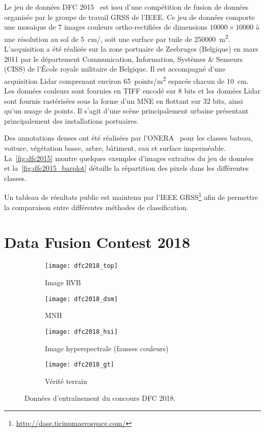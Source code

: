 Le jeu de données \gls{DFC} 2015~\cite{campos-taberner_processing_2016} est issu d'une compétition de fusion de données organisée par le groupe de travail \gls{GRSS} de l'\gls{IEEE}. Ce jeu de données comporte une mosaïque de 7 images couleurs ortho-rectifiées de dimensions $10 000\times10 000$ à une résolution au sol de \SI{5}{\centi\meter/\px}, soit une surface par tuile de \SI{250 000}{\meter\squared}. L'acquisition a été réalisée sur la zone portuaire de Zeebruges (Belgique) en mars 2011 par le département Communication, Information, Systèmes \& Senseurs (CISS) de l'École royale militaire de Belgique. Il est accompagné d'une acquisition \gls{Lidar} comprenant environ \SI{65}{points/\meter\squared} espacés chacun de \SI{10}{\centi\meter}. Les données couleurs sont fournies en \gls{TIFF} encodé sur 8 bits et les données \gls{Lidar} sont fournis rastérisées sous la forme d'un \gls{MNE} en flottant sur 32 bits, ainsi qu'un nuage de points. Il s'agit d'une scène principalement urbaine présentant principalement des installations portuaires.

 Des annotations denses ont été réalisées par l'\gls{ONERA}~\cite{lagrange_benchmarking_2015} pour les classes bateau, voiture, végétation basse, arbre, bâtiment, eau et surface imperméable. La~\cref{fig:dfc2015} montre quelques exemples d'images extraites du jeu de données et la~\cref{fig:dfc2015_barplot} détaille la répartition des pixels dans les différentes classes.

Un tableau de résultats public est maintenu par l'\gls{IEEE} \gls{GRSS}\footnote{\url{http://dase.ticinumaerospace.com/}} afin de permettre la comparaison entre différentes méthodes de classification.

\section{Data Fusion Contest 2018}
\label{annexe:dfc2018}

\begin{figure}[h]
  \begin{subfigure}{\textwidth}
    \texttt{[image: dfc2018\_top]}
    \caption{Image \gls{RVB}}
  \end{subfigure}
  \begin{subfigure}{\textwidth}
    \texttt{[image: dfc2018\_dsm]}
    \caption{\gls{MNH}}
  \end{subfigure}
  \begin{subfigure}{\textwidth}
    \texttt{[image: dfc2018\_hsi]}
    \caption{Image hyperspectrale (fausses couleurs)}
  \end{subfigure}
  \begin{subfigure}{\textwidth}
    \texttt{[image: dfc2018\_gt]}
    \caption{Vérité terrain}
  \end{subfigure}
  \caption{Données d'entraînement du concours \gls{DFC} 2018.}
  \label{fig:dfc2018}
\end{figure}

